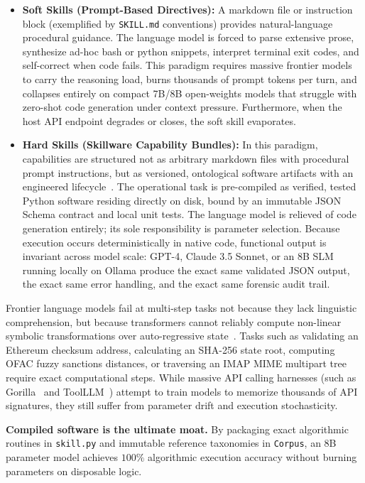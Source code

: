 \begin{itemize}[leftmargin=*]
  \item \textbf{Soft Skills (Prompt-Based Directives):} A markdown file or instruction block (exemplified by \texttt{SKILL.md} conventions) provides natural-language procedural guidance. The language model is forced to parse extensive prose, synthesize ad-hoc bash or python snippets, interpret terminal exit codes, and self-correct when code fails. This paradigm requires massive frontier models to carry the reasoning load, burns thousands of prompt tokens per turn, and collapses entirely on compact 7B/8B open-weights models that struggle with zero-shot code generation under context pressure. Furthermore, when the host API endpoint degrades or closes, the soft skill evaporates.
  \item \textbf{Hard Skills (Skillware Capability Bundles):} In this paradigm, capabilities are structured not as arbitrary markdown files with procedural prompt instructions, but as versioned, ontological software artifacts with an engineered lifecycle~\cite{fan2026skillware}. The operational task is pre-compiled as verified, tested Python software residing directly on disk, bound by an immutable JSON Schema contract and local unit tests. The language model is relieved of code generation entirely; its sole responsibility is parameter selection. Because execution occurs deterministically in native code, functional output is invariant across model scale: GPT-4, Claude 3.5 Sonnet, or an 8B SLM running locally on Ollama produce the exact same validated JSON output, the exact same error handling, and the exact same forensic audit trail.
\end{itemize}

Frontier language models fail at multi-step tasks not because they lack linguistic comprehension, but because transformers cannot reliably compute non-linear symbolic transformations over auto-regressive state~\cite{dziri2023faith, valmeekam2023planning}. Tasks such as validating an Ethereum checksum address, calculating an SHA-256 state root, computing OFAC fuzzy sanctions distances, or traversing an IMAP MIME multipart tree require exact computational steps. While massive API calling harnesses (such as Gorilla~\cite{patil2023gorilla} and ToolLLM~\cite{qin2024toolllm}) attempt to train models to memorize thousands of API signatures, they still suffer from parameter drift and execution stochasticity.

\textbf{Compiled software is the ultimate moat.} By packaging exact algorithmic routines in \texttt{skill.py} and immutable reference taxonomies in \texttt{Corpus}, an 8B parameter model achieves $100\%$ algorithmic execution accuracy without burning parameters on disposable logic.

